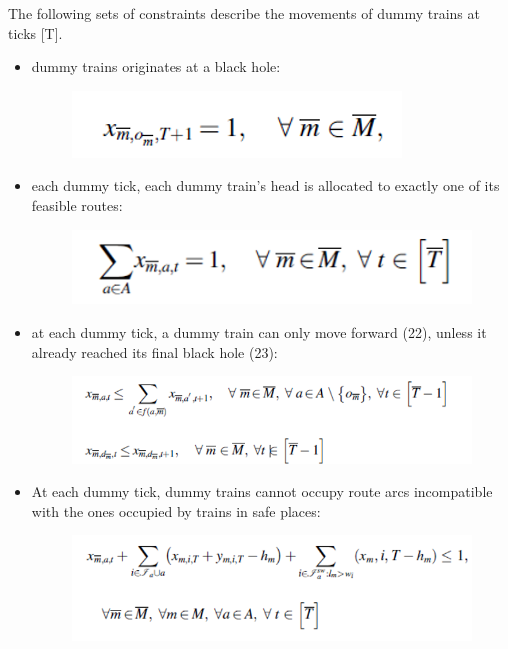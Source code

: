 \documentclass[sigplan,screen]{acmart}
\begin{document}
The following sets of constraints describe the movements of dummy trains at ticks [T]. 
\begin{itemize}
    \item dummy trains originates at a black hole:
 \begin{figure}[h]
    \centering
    \includegraphics[width=\linewidth]{3.png}
\end{figure}
\item each dummy tick, each dummy train’s head is allocated to exactly one of its feasible routes:
 \begin{figure}[h]
    \centering
    \includegraphics[width=\linewidth]{4.png}
\end{figure}
\item at each dummy tick, a dummy train can only move forward (22), unless it already reached its final black hole (23):
 \begin{figure}[h]
    \centering
    \includegraphics[width=\linewidth]{5.png}
\end{figure}
\item At each dummy tick, dummy trains cannot occupy route arcs incompatible with the ones occupied by trains in safe places:
 \begin{figure}[h]
    \centering
    \includegraphics[width=\linewidth]{6.png}
\end{figure}


\end{itemize}
\end{document}
